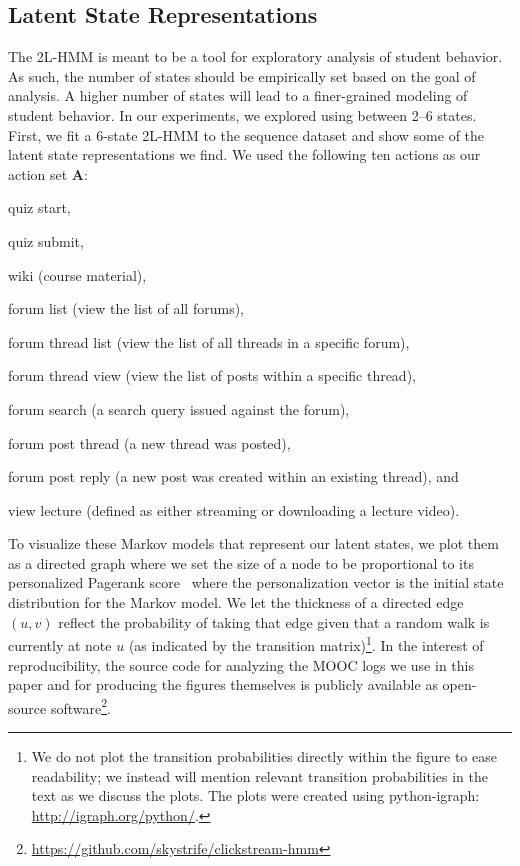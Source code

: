 \subsection{Latent State Representations}
The 2L-HMM is meant to be a tool for exploratory analysis of student
behavior. As such, the number of states should be empirically set based on
the goal of analysis. A higher number of states will lead to a
finer-grained modeling of student behavior. In our experiments, we explored
using between 2--6 states. First, we fit a 6-state 2L-HMM to the
\textretrieval{} sequence dataset and show some of the latent state
representations we find. We used the following ten actions as our action
set $\mathbf{A}$:
\begin{enumerate*}[label=(\arabic*)]
  \item quiz start,
  \item quiz submit,
  \item wiki (course material),
  \item forum list (view the list of all forums),
  \item forum thread list (view the list of all threads in a specific
    forum),
  \item forum thread view (view the list of posts within a specific
    thread),
  \item forum search (a search query issued against the forum),
  \item forum post thread (a new thread was posted),
  \item forum post reply (a new post was created within an existing
    thread), and
  \item view lecture (defined as either streaming or downloading a lecture
    video).
\end{enumerate*}

To visualize these Markov models that represent our latent states, we plot
them as a directed graph where we set the size of a node to be proportional
to its personalized Pagerank score~\cite{Page:1999:PageRank, Jeh:2003:WWW}
where the personalization vector is the initial state distribution for the
Markov model. We let the thickness of a directed edge $(u, v)$ reflect the
probability of taking that edge given that a random walk is currently at
note $u$ (as indicated by the transition matrix)\footnote{We do not plot
the transition probabilities directly within the figure to ease
readability; we instead will mention relevant transition probabilities in
the text as we discuss the plots. The plots were created using
python-igraph: \url{http://igraph.org/python/}.}. In the interest of
reproducibility, the source code for analyzing the MOOC logs we use in this
paper and for producing the figures themselves is publicly available
as open-source
software\footnote{\url{https://github.com/skystrife/clickstream-hmm}}.


